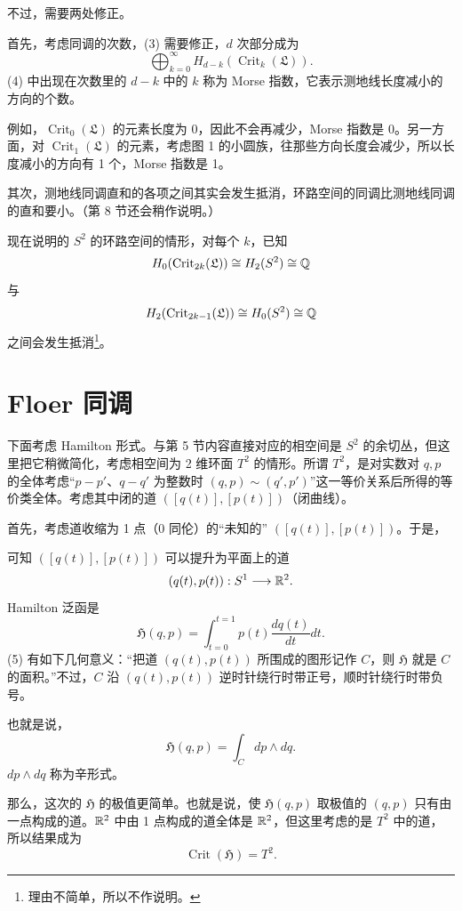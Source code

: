 不过，需要两处修正。

首先，考虑同调的次数，(3) 需要修正，$d$ 次部分成为
\[ \bigoplus_{k=0}^{\infty}H_{d-k}(\operatorname{Crit}_{k}(\mathfrak{L})). \tag{4} \]
(4) 中出现在次数里的 $d-k$ 中的 $k$ 称为 Morse 指数，它表示测地线长度减小的方向的个数。

例如，$\operatorname{Crit}_{0}(\mathfrak{L})$ 的元素长度为 0，因此不会再减少，Morse 指数是 0。另一方面，对 $\operatorname{Crit}_{1}(\mathfrak{L})$ 的元素，考虑图 1 的小圆族，往那些方向长度会减少，所以长度减小的方向有 1 个，Morse 指数是 1。

其次，测地线同调直和的各项之间其实会发生抵消，环路空间的同调比测地线同调的直和要小。（第 8 节还会稍作说明。）

现在说明的 $S^{2}$ 的环路空间的情形，对每个 $k$，已知
\[ H_{0}(\operatorname{Crit}_{2k}(\mathfrak{L}))\cong H_{2}(S^{2})\cong\mathbb{Q} \]
与
\[ H_{2}(\operatorname{Crit}_{2k-1}(\mathfrak{L}))\cong H_{0}(S^{2})\cong\mathbb{Q} \]
之间会发生抵消\footnote{理由不简单，所以不作说明。}。

\section{Floer 同调}

下面考虑 Hamilton 形式。与第 5 节内容直接对应的相空间是 $S^{2}$ 的余切丛，但这里把它稍微简化，考虑相空间为 2 维环面 $T^{2}$ 的情形。所谓 $T^{2}$，是对实数对 $q,p$ 的全体考虑“$p-p'$、$q-q'$ 为整数时 $(q,p)\sim(q',p')$”这一等价关系后所得的等价类全体。考虑其中闭的道 $([q(t)],[p(t)])$（闭曲线）。

首先，考虑道收缩为 1 点（0 同伦）的“未知的” $([q(t)],[p(t)])$。于是，

可知 $([q(t)],[p(t)])$ 可以提升为平面上的道
\[ (q(t),p(t)):S^{1}\longrightarrow\mathbb{R}^{2}. \]
Hamilton 泛函是
\[ \mathfrak{H}(q,p)=\int_{t=0}^{t=1}p(t)\frac{dq(t)}{dt}dt. \tag{5} \]
(5) 有如下几何意义：“把道 $(q(t),p(t))$ 所围成的图形记作 $C$，则 $\mathfrak{H}$ 就是 $C$ 的面积。”不过，$C$ 沿 $(q(t),p(t))$ 逆时针绕行时带正号，顺时针绕行时带负号。

也就是说，
\[ \mathfrak{H}(q,p)=\int_{C}dp\wedge dq. \]
$dp\wedge dq$ 称为辛形式。

那么，这次的 $\mathfrak{H}$ 的极值更简单。也就是说，使 $\mathfrak{H}(q,p)$ 取极值的 $(q,p)$ 只有由一点构成的道。$\mathbb{R}^{2}$ 中由 1 点构成的道全体是 $\mathbb{R}^{2}$，但这里考虑的是 $T^{2}$ 中的道，所以结果成为
\[ \operatorname{Crit}(\mathfrak{H})=T^{2}. \tag{6} \]

